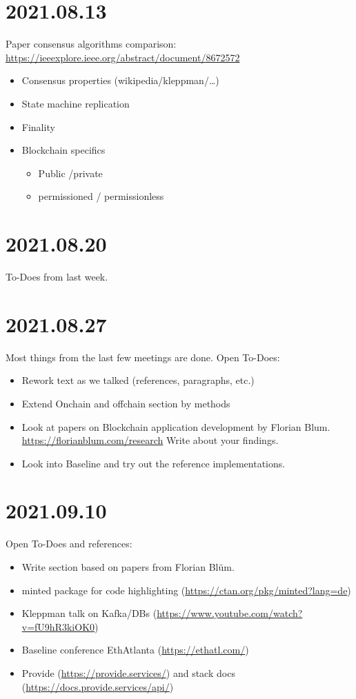 \section{2021.08.13}
Paper consensus algorithms comparison: \url{https://ieeexplore.ieee.org/abstract/document/8672572}

\begin{itemize}
\item Consensus properties (wikipedia/kleppman/\ldots)
\item State machine replication
\item Finality
\item Blockchain specifics
  \begin{itemize}
  \item Public /private
  \item permissioned / permissionless
  \end{itemize}
\end{itemize}

\section{2021.08.20}
To-Does from last week.

\section{2021.08.27}
Most things from the last few meetings are done. Open To-Does:
\begin{itemize}
\item Rework text as we talked (references, paragraphs, etc.)
\item Extend Onchain and offchain section by methods
\item Look at papers on Blockchain application development by Florian
  Blum. \url{https://florianblum.com/research} Write about your
  findings.
\item Look into Baseline and try out the reference implementations.
\end{itemize}

\section{2021.09.10}
Open To-Does and references:
\begin{itemize}
\item Write section based on papers from Florian Blüm.
\item minted package for code highlighting (\url{https://ctan.org/pkg/minted?lang=de})
\item Kleppman talk on Kafka/DBs (\url{https://www.youtube.com/watch?v=fU9hR3kiOK0})
\item Baseline conference EthAtlanta (\url{https://ethatl.com/})
\item Provide (\url{https://provide.services/}) and stack docs (\url{https://docs.provide.services/api/})
\end{itemize}

